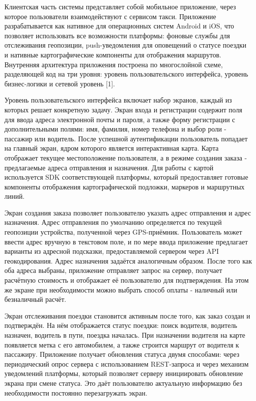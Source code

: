 {\gostFont
	
	\par \redline Клиентская часть системы представляет собой мобильное приложение, через которое пользователи взаимодействуют с сервисом такси. Приложение разрабатывается как нативное для операционных систем Android и iOS, что позволяет использовать все возможности платформы: фоновые службы для отслеживания геопозиции, push-уведомления для оповещений о статусе поездки и нативные картографические компоненты для отображения маршрутов. Внутренняя архитектура приложения построена по многослойной схеме, разделяющей код на три уровня: уровень пользовательского интерфейса, уровень бизнес-логики и сетевой уровень [1].
	
\par \redline Уровень пользовательского интерфейса включает набор экранов, каждый из которых решает конкретную задачу. Экран входа и регистрации содержит поля для ввода адреса электронной почты и пароля, а также форму регистрации с дополнительными полями: имя, фамилия, номер телефона и выбор роли - пассажир или водитель. После успешной аутентификации пользователь попадает на главный экран, ядром которого является интерактивная карта. Карта отображает текущее местоположение пользователя, а в режиме создания заказа - предлагаемые адреса отправления и назначения. Для работы с картой используется SDK соответствующей платформы, который предоставляет готовые компоненты отображения картографической подложки, маркеров и маршрутных линий.

\par \redline Экран создания заказа позволяет пользователю указать адрес отправления и адрес назначения. Адрес отправления по умолчанию определяется по текущей геопозиции устройства, полученной через GPS-приёмник. Пользователь может ввести адрес вручную в текстовом поле, и по мере ввода приложение предлагает варианты из адресной подсказки, предоставляемой сервером через API геокодирования. Адрес назначения задаётся аналогичным образом. После того как оба адреса выбраны, приложение отправляет запрос на сервер, получает расчётную стоимость и отображает её пользователю для подтверждения. На этом же экране при необходимости можно выбрать способ оплаты - наличный или безналичный расчёт.

\par \redline Экран отслеживания поездки становится активным после того, как заказ создан и подтверждён. На нём отображается статус поездки: поиск водителя, водитель назначен, водитель в пути, поездка началась. При назначении водителя на карте появляется метка с его автомобилем, а также строится маршрут от водителя к пассажиру. Приложение получает обновления статуса двумя способами: через периодический опрос сервера с использованием REST-запроса и через механизм уведомлений платформы, который позволяет серверу инициировать обновление экрана при смене статуса. Это даёт пользователю актуальную информацию без необходимости постоянно перезагружать экран.

}
